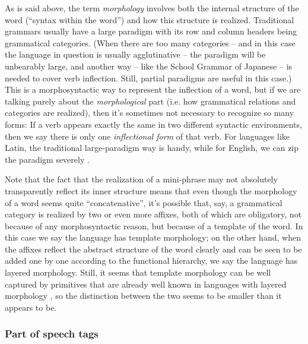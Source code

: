 \documentclass[UTF8, a4paper, oneside, scheme=plain, 12pt]{ctexbook}
\newcommand*{\citesec}[1]{\S~{#1}}
\newcommand*{\citechap}[1]{Ch.~{#1}}
\newcommand*{\citechapsec}[2]{\citechap{#1}.\citesec{#2}}
\newcommand*{\term}[1]{\emph{#1}}
\begin{document}
{As is said above, the term \term{morphology}
involves both the internal structure of the word 
(``syntax within the word'')
and how this structure is realized.
Traditional grammars usually have a large paradigm
with its row and column headers being grammatical categories.
(When there are too many categories 
-- and in this case the language in question is usually agglutinative -- 
the paradigm will be unbearably large, 
and another way -- like the School Grammar of Japanese -- is needed to cover verb inflection.
Still, partial paradigms are useful in this case.) 
This is a morphosyntactic way to represent the inflection of a word, 
but if we are talking purely about the \emph{morphological} part
(i.e. how grammatical relations and categories are realized),
then it's sometimes not necessary to recognize so many forms:
If a verb appears exactly the same in two different syntactic environments,
then we say there is only one \emph{inflectional form} of that verb.
For languages like Latin, 
the traditional large-paradigm way is handy,
while for English, we can zip the paradigm severely \citep[\citechapsec{3}{1.2}]{cgel}.

Note that the fact that the realization of a mini-phrase 
may not absolutely transparently reflect its inner structure 
means that even though the morphology of a word 
seems quite ``concatenative'',
it's possible that, say, 
a grammatical category is realized by two or even more affixes, 
both of which are obligatory,
not because of any morphosyntactic reason, 
but because of a template of the word. 
In this case we say the language has template morphology;
on the other hand, 
when the affixes reflect the abstract structure of the word clearly 
and can be seen to be added one by one 
according to the functional hierarchy,
we say the language has layered morphology.
Still, it seems that template morphology
can be well captured by primitives that are already well known 
in languages with layered morphology \cite{oxford2019fission},
so the distinction between the two seems to be smaller than it appears to be.

\subsubsection{Part of speech tags}\label{sec:theory.pos}

}
\end{document}

